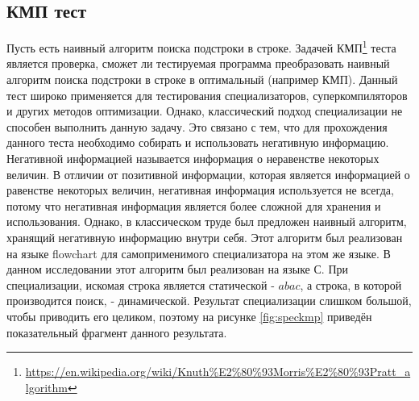 \subsection{ КМП тест}
Пусть есть наивный алгоритм поиска подстроки в строке. Задачей КМП\footnote{\url{https://en.wikipedia.org/wiki/Knuth\%E2\%80\%93Morris\%E2\%80\%93Pratt\_algorithm}} теста является проверка, сможет ли тестируемая программа преобразовать наивный алгоритм поиска подстроки в строке в оптимальный (например КМП). Данный тест широко применяется для тестирования специализаторов, суперкомпиляторов и других методов оптимизации. Однако, классический подход специализации не способен выполнить данную задачу. Это связано с тем, что для прохождения данного теста необходимо собирать и использовать негативную информацию. Негативной информацией называется информация о неравенстве некоторых величин. В отличии от позитивной информации, которая является информацией о равенстве некоторых величин, негативная информация используется не всегда, потому что негативная информация является более сложной для хранения и использования. Однако, в классическом труде \cite{PEAPG} был предложен наивный алгоритм, хранящий негативную информацию внутри себя. Этот алгоритм был реализован на языке flowchart для самоприменимого специализатора на этом же языке. В данном исследовании этот алгоритм был реализован на языке С.  При специализации, искомая строка является статической - $abac$, а строка, в которой производится поиск, - динамической. Результат специализации слишком большой, чтобы приводить его целиком, поэтому на рисунке \ref{fig:speckmp} приведён показательный фрагмент данного результата. 

